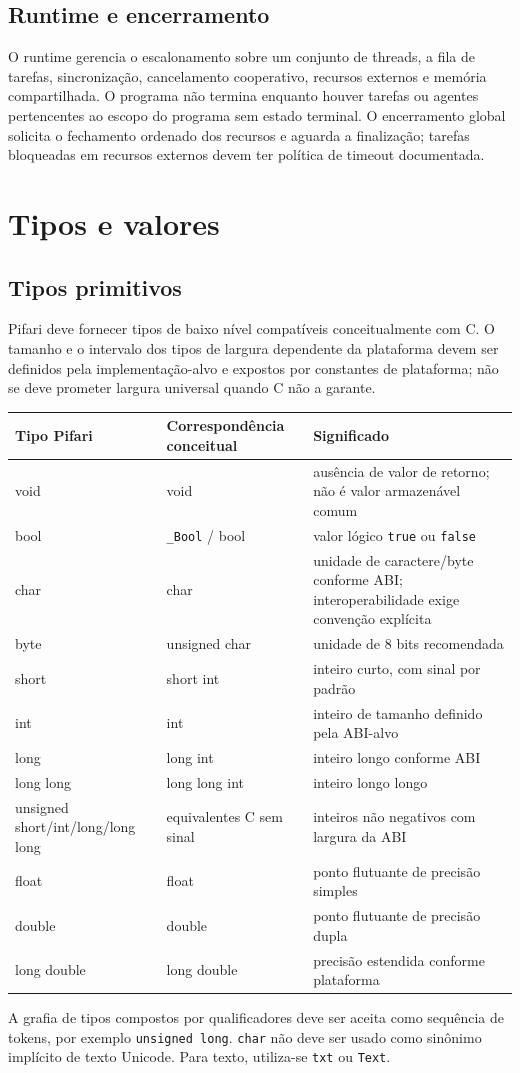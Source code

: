 \documentclass[12pt,a4paper]{article}
\begin{document}
\subsection{Runtime e encerramento}
O runtime gerencia o escalonamento sobre um conjunto de threads, a fila de tarefas, sincronização, cancelamento cooperativo, recursos externos e memória compartilhada. O programa não termina enquanto houver tarefas ou agentes pertencentes ao escopo do programa sem estado terminal. O encerramento global solicita o fechamento ordenado dos recursos e aguarda a finalização; tarefas bloqueadas em recursos externos devem ter política de timeout documentada.
\section{Tipos e valores}
\subsection{Tipos primitivos}
Pifari deve fornecer tipos de baixo nível compatíveis conceitualmente com C. O tamanho e o intervalo dos tipos de largura dependente da plataforma devem ser definidos pela implementação-alvo e expostos por constantes de plataforma; não se deve prometer largura universal quando C não a garante.
\begin{longtable}{>{\ttfamily}p{2.4cm}p{3.0cm}p{8.0cm}}
\toprule
Tipo Pifari & Correspondência conceitual & Significado\\
\midrule
void & void & ausência de valor de retorno; não é valor armazenável comum\\
bool & \texttt{\_Bool} / bool & valor lógico \texttt{true} ou \texttt{false}\\
char & char & unidade de caractere/byte conforme ABI; interoperabilidade exige convenção explícita\\
byte & unsigned char & unidade de 8 bits recomendada\\
short & short int & inteiro curto, com sinal por padrão\\
int & int & inteiro de tamanho definido pela ABI-alvo\\
long & long int & inteiro longo conforme ABI\\
long long & long long int & inteiro longo longo\\
unsigned short/int/long/long long & equivalentes C sem sinal & inteiros não negativos com largura da ABI\\
float & float & ponto flutuante de precisão simples\\
double & double & ponto flutuante de precisão dupla\\
long double & long double & precisão estendida conforme plataforma\\
\bottomrule
\end{longtable}
A grafia de tipos compostos por qualificadores deve ser aceita como sequência de tokens, por exemplo \texttt{unsigned long}. \texttt{char} não deve ser usado como sinônimo implícito de texto Unicode. Para texto, utiliza-se \texttt{txt} ou \texttt{Text}.
\end{document}
